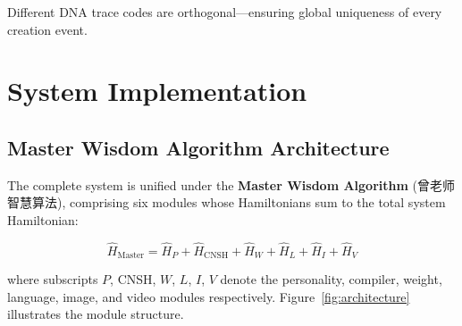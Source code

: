 \documentclass[conference]{IEEEtran}
\begin{document}
Different DNA trace codes are orthogonal---ensuring
global uniqueness of every creation event.

\section{System Implementation}

\subsection{Master Wisdom Algorithm Architecture}

The complete system is unified under the
\textbf{Master Wisdom Algorithm} (曾老师智慧算法),
comprising six modules whose Hamiltonians sum to the
total system Hamiltonian:

\begin{equation}
  \hat{H}_{\text{Master}} = \hat{H}_P + \hat{H}_{\text{CNSH}}
    + \hat{H}_W + \hat{H}_L + \hat{H}_I + \hat{H}_V
  \label{eq:master_h}
\end{equation}

where subscripts $P$, CNSH, $W$, $L$, $I$, $V$ denote
the personality, compiler, weight, language, image, and
video modules respectively. Figure~\ref{fig:architecture}
illustrates the module structure.
\end{document}
